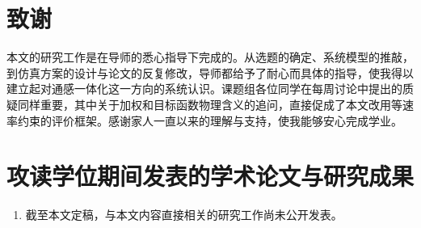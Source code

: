 \documentclass[12pt,a4paper,openany,UTF8]{ctexrep}
\begin{document}
\setcounter{page}{1}









\chapter*{致\quad 谢}
本文的研究工作是在导师的悉心指导下完成的。从选题的确定、系统模型的推敲，到仿真方案的设计与论文的反复修改，导师都给予了耐心而具体的指导，使我得以建立起对通感一体化这一方向的系统认识。课题组各位同学在每周讨论中提出的质疑同样重要，其中关于加权和目标函数物理含义的追问，直接促成了本文改用等速率约束的评价框架。感谢家人一直以来的理解与支持，使我能够安心完成学业。
\newpage

\chapter*{攻读学位期间发表的学术论文与研究成果}
\begin{enumerate}
  \item 截至本文定稿，与本文内容直接相关的研究工作尚未公开发表。
\end{enumerate}
\end{document}
